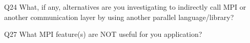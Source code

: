 \begin{description}%
\item{Q24} What, if any, alternatives are you investigating to indirectly call MPI or another communication layer by using another parallel language/library?%
\item{Q27} What MPI feature(s) are NOT useful for you application?%
\end{description}%
